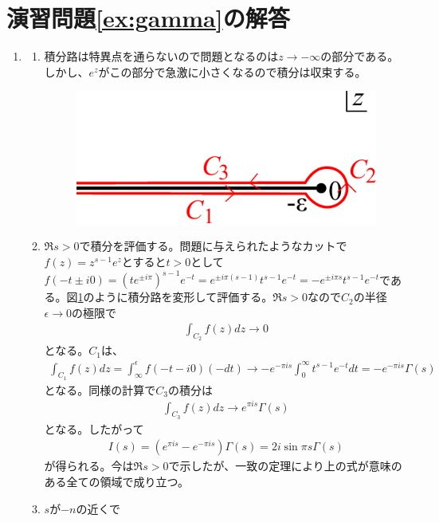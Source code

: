 \documentclass[report,paper=a4, fontsize=12pt, line_length=16cm, number_of_lines=33,dvipdfmx]{jlreq}
\numberwithin{equation}{section}
\begin{document}
\section*{演習問題\ref{ex:gamma}の解答}
\begin{enumerate}
  \item 
  \begin{enumerate}
    \item 積分路は特異点を通らないので問題となるのは$z\to -\infty$の部分である。しかし、$e^z$がこの部分で急激に小さくなるので積分は収束する。
    \begin{figure}[htbp]
      \centering
      \includegraphics{c1c2c3.pdf}
      \caption{}
      \label{c1c2c3}
    \end{figure}
    \item $\Re s >0 $で積分を評価する。問題に与えられたようなカットで$f(z)=z^{s-1}e^{z}$とすると$t>0$として$f(-t\pm i0)=(te^{\pm i\pi})^{s-1}e^{-t}=e^{\pm i\pi(s-1)}t^{s-1}e^{-t}=-e^{\pm i\pi s}t^{s-1}e^{-t}$である。図\ref{c1c2c3}のように積分路を変形して評価する。$\Re s>0$なので$C_2$の半径$\epsilon\to 0$の極限で
    \begin{align*}
      \int_{C_2}f(z)dz\to 0
    \end{align*}
    となる。$C_1$は、
    \begin{align*}
      \int_{C_1}f(z)dz=\int_{\infty}^{\epsilon}f(-t-i0)(-dt)\to
      -e^{-\pi i s}\int_{0}^{\infty}t^{s-1}e^{-t}dt=-e^{-\pi i s}\Gamma(s)
    \end{align*}
    となる。同様の計算で$C_3$の積分は
    \begin{align*}
      \int_{C_3}f(z)dz\to e^{\pi i s}\Gamma(s)
    \end{align*}
    となる。したがって
    \begin{align*}
      I(s)=(e^{\pi i s}-e^{-\pi i s})\Gamma(s)=2i \sin \pi s \Gamma(s)
    \end{align*}
    が得られる。今は$\Re s >0$で示したが、一致の定理により上の式が意味のある全ての領域で成り立つ。
    \item $s$が$-n$の近くで

\end{enumerate}
\end{enumerate}
\end{document}
